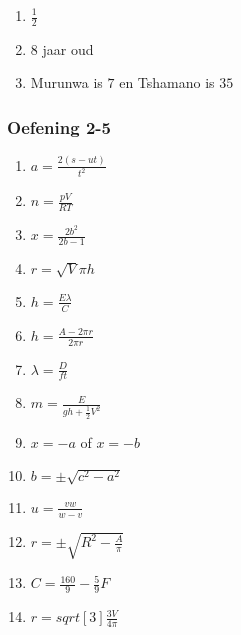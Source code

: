 {\begin{multicols}{3}
\begin{enumerate}[noitemsep, label=\textbf{\arabic*}. ]
\item $\frac{1}{2}$ %
\item $8$ jaar oud %
\item Murunwa is $7$ en Tshamano is $35$ %
\end{enumerate}

\subsubsection*{Oefening 2-5} %

\begin{enumerate}[itemsep=1pt,  label=\textbf{\arabic*}. ] 
\item $a = \frac{2(s - ut)}{t^2}$%
\item $n = \frac{pV}{RT}$%
\item $x = \frac{2b^2}{2b - 1}$%
\item $r = \sqrt{V}{\pi h}$%
\item $h = \frac{E\lambda}{C}$%

\item $h = \frac{A - 2\pi r}{2\pi r}$%
\item $\lambda = \frac{D}{ft}$%
\item $m =\frac{E}{gh + \frac{1}{2}V^2}$%
\item $x=-a$ of $x=-b$ %
\item $b=\pm \sqrt{c^2-a^2}$ %
\item $u=\frac{vw}{w-v}$ %
\item $r=\pm \sqrt{R^2-\frac{A}{\pi}}$ 
\item $C=\frac{160}{9}-\frac{5}{9}F$ %
\item $r=sqrt[3]{\frac{3V}{4 \pi}}$ %
\end{enumerate}



\end{multicols}}
